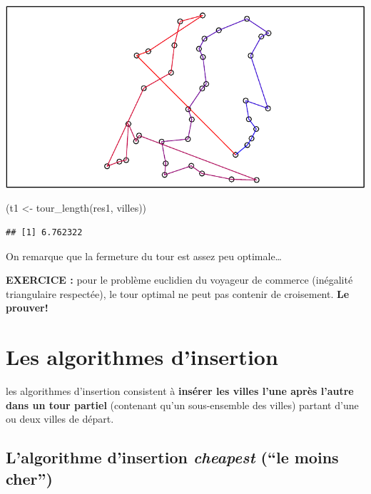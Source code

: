 \documentclass[
]{article}
\newenvironment{Shaded}{\begin{snugshade}}{\end{snugshade}}
\newcommand{\FunctionTok}[1]{\textcolor[rgb]{0.00,0.00,0.00}{#1}}
\newcommand{\NormalTok}[1]{#1}
\newcommand{\OtherTok}[1]{\textcolor[rgb]{0.56,0.35,0.01}{#1}}
\begin{document}
\includegraphics{rapport_TSP_files/figure-latex/plus proche voisin-1.pdf}

\begin{Shaded}
\begin{Highlighting}[]
\NormalTok{(t1 }\OtherTok{\textless{}{-}} \FunctionTok{tour\_length}\NormalTok{(res1, villes))}
\end{Highlighting}
\end{Shaded}

\begin{verbatim}
## [1] 6.762322
\end{verbatim}

On remarque que la fermeture du tour est assez peu optimale\ldots{}

\textbf{EXERCICE :} pour le problème euclidien du voyageur de commerce
(inégalité triangulaire respectée), le tour optimal ne peut pas contenir
de croisement. \textbf{Le prouver!}

\hypertarget{les-algorithmes-dinsertion}{%
\section{Les algorithmes d'insertion}\label{les-algorithmes-dinsertion}}

les algorithmes d'insertion consistent à \textbf{insérer les villes
l'une après l'autre dans un tour partiel} (contenant qu'un sous-ensemble
des villes) partant d'une ou deux villes de départ.

\hypertarget{lalgorithme-dinsertion-cheapest-le-moins-cher}{%
\subsection{\texorpdfstring{L'algorithme d'insertion \emph{cheapest}
(``le moins
cher'')}{L'algorithme d'insertion cheapest (``le moins cher'')}}\label{lalgorithme-dinsertion-cheapest-le-moins-cher}}
\end{document}
